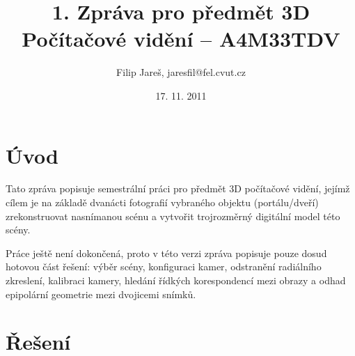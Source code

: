 \documentclass[11pt,oneside,a4paper,pdftex]{article}   %
\title{1. Zpráva pro předmět 3D Počítačové vidění -- A4M33TDV}
\date{17. 11. 2011}
\author{Filip Jareš, jaresfil@fel.cvut.cz}
\begin{document}
\maketitle

\section{Úvod}

Tato zpráva popisuje semestrální práci pro předmět 3D počítačové vidění, jejímž cílem je na základě
dvanácti fotografií vybraného objektu (portálu/dveří) zrekonstruovat nasnímanou scénu a vytvořit
trojrozměrný digitální model této scény.

Práce ještě není dokončená, proto v této verzi zpráva popisuje pouze dosud hotovou část řešení:
výběr scény, konfiguraci kamer, odstranění radiálního zkreslení, kalibraci kamery, hledání řídkých
korespondencí mezi obrazy a odhad epipolární geometrie mezi dvojicemi snímků.

\section{Řešení}
\end{document}
